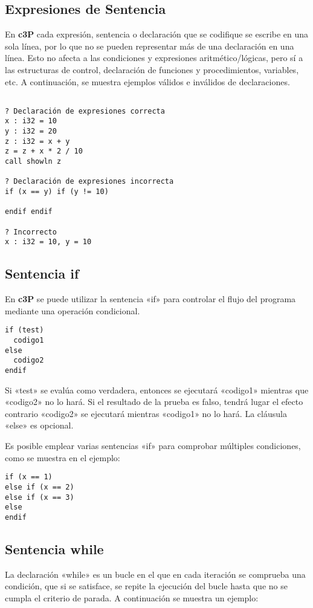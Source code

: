 \subsection{Expresiones de Sentencia}

En \textbf{c3P} cada expresión, sentencia o declaración que se codifique se escribe en una sola
línea, por lo que no se pueden representar más de una declaración en una línea. Esto
no afecta a las condiciones y expresiones aritmético/lógicas, pero sí a las estructuras
de control, declaración de funciones y procedimientos, variables, etc. A continuación,
se muestra ejemplos válidos e inválidos de declaraciones.

\begin{verbatim}

? Declaración de expresiones correcta
x : i32 = 10
y : i32 = 20
z : i32 = x + y
z = z + x * 2 / 10
call showln z

? Declaración de expresiones incorrecta
if (x == y) if (y != 10)

endif endif

? Incorrecto
x : i32 = 10, y = 10
\end{verbatim}

\subsection{Sentencia if}

En \textbf{c3P} se puede utilizar la sentencia «if» para controlar el flujo
del programa mediante una operación condicional.

\begin{verbatim}
if (test)
  codigo1
else
  codigo2
endif
\end{verbatim}

Si «test» se evalúa como verdadera, entonces se ejecutará «codigo1» mientras que «codigo2» no lo hará.
Si el resultado de la prueba es falso, tendrá lugar el efecto contrario «codigo2» se ejecutará mientras
«codigo1» no lo hará. La cláusula «else» es opcional.

Es posible emplear varias sentencias «if» para comprobar múltiples condiciones, como se muestra en el ejemplo:

\begin{verbatim}
if (x == 1)
else if (x == 2)
else if (x == 3)
else
endif
\end{verbatim}

\subsection{Sentencia while}
La declaración «while» es un bucle en el que en cada iteración se comprueba una condición,
que si se satisface, se repite la ejecución del bucle hasta que no se cumpla el criterio
de parada. A continuación se muestra un ejemplo:

